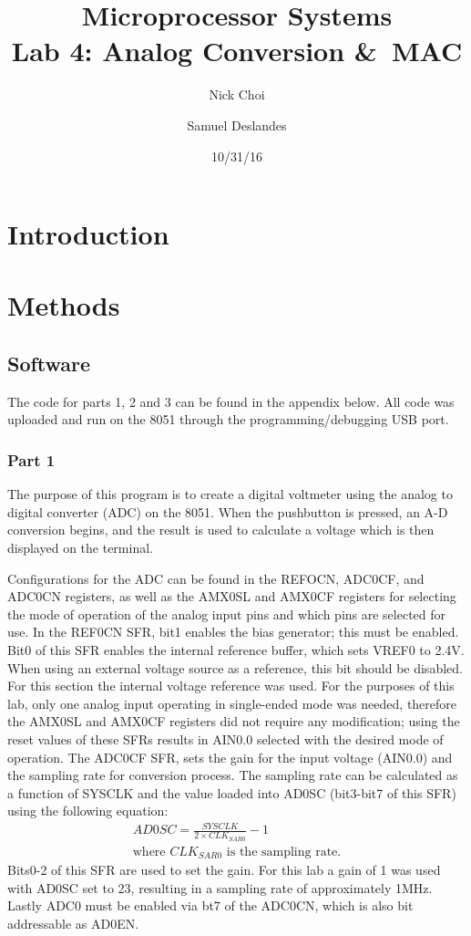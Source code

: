 \documentclass[12pt]{article}
\begin{document}
\title{Microprocessor Systems\\ Lab 4: Analog Conversion \&\ MAC }
\author{Nick Choi \and Samuel Deslandes}
\date{10/31/16}
\maketitle
\pagebreak
\section{Introduction}


\section{Methods}
\subsection{Software}
The code for parts 1, 2 and 3 can be found in the appendix below. All code was uploaded and run on the 8051 through the programming/debugging USB port. 

\subsubsection{Part 1}

The purpose of this program is to create a digital voltmeter using the analog to digital converter (ADC) on the 8051. When the pushbutton is pressed, an A-D conversion begins, and the result is used to calculate a voltage which is then displayed on the terminal. 

Configurations for the ADC can be found in the REFOCN, ADC0CF, and ADC0CN registers, as well as the AMX0SL and AMX0CF registers for selecting the mode of operation of the analog input pins and which pins are selected for use. In the REF0CN SFR, bit1 enables the bias generator; this must be enabled. Bit0 of this SFR enables the internal reference buffer, which sets VREF0 to 2.4V. When using an external voltage source as a reference, this bit should be disabled. For this section the internal voltage reference was used. For the purposes of this lab, only one analog input operating in single-ended mode was needed, therefore the AMX0SL and AMX0CF registers did not require any modification; using the reset values of these SFRs results in AIN0.0 selected with the desired mode of operation. The ADC0CF SFR, sets the gain for the input voltage (AIN0.0) and the sampling rate for conversion process. The sampling rate can be calculated as a function of SYSCLK and the value loaded into AD0SC (bit3-bit7 of this SFR) using the following equation:
\begin{align*}
AD0SC = \frac{SYSCLK}{2\times CLK_{SAR0}}-1\\
\text{where $CLK_{SAR0}$ is the sampling rate.}
\end{align*}
\noindent
Bits0-2 of this SFR are used to set the gain. For this lab a gain of 1 was used with AD0SC set to 23, resulting in a sampling rate of approximately \si{1}{MHz}. Lastly ADC0 must be enabled via bt7 of the ADC0CN, which is also bit addressable as AD0EN.
\end{document}
